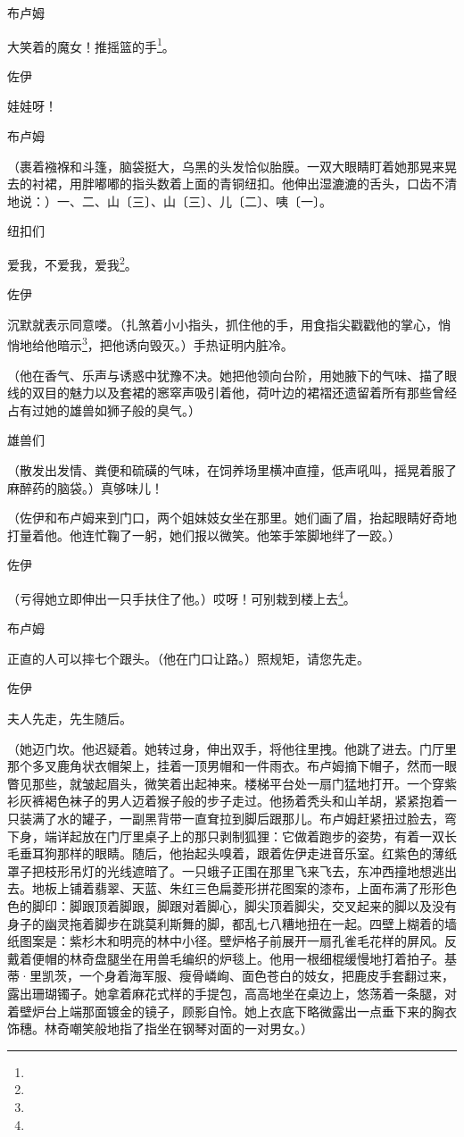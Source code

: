 \par 布卢姆
\par 大笑着的魔女！推摇篮的手\footnote{}。
\par 佐伊
\par 娃娃呀！
\par 布卢姆
\par （裹着襁褓和斗篷，脑袋挺大，乌黑的头发恰似胎膜。一双大眼睛盯着她那晃来晃去的衬裙，用胖嘟嘟的指头数着上面的青铜纽扣。他伸出湿漉漉的舌头，口齿不清地说：）一、二、山〔三〕、山〔三〕、儿〔二〕、咦〔一〕。
\par 纽扣们
\par 爱我，不爱我，爱我\footnote{}。
\par 佐伊
\par 沉默就表示同意喽。（扎煞着小小指头，抓住他的手，用食指尖戳戳他的掌心，悄悄地给他暗示\footnote{}，把他诱向毁灭。）手热证明内脏冷。
\par （他在香气、乐声与诱惑中犹豫不决。她把他领向台阶，用她腋下的气味、描了眼线的双目的魅力以及套裙的窸窣声吸引着他，荷叶边的裙褶还遗留着所有那些曾经占有过她的雄兽如狮子般的臭气。）
\par 雄兽们
\par （散发出发情、粪便和硫磺的气味，在饲养场里横冲直撞，低声吼叫，摇晃着服了麻醉药的脑袋。）真够味儿！
\par （佐伊和布卢姆来到门口，两个姐妹妓女坐在那里。她们画了眉，抬起眼睛好奇地打量着他。他连忙鞠了一躬，她们报以微笑。他笨手笨脚地绊了一跤。）
\par 佐伊
\par （亏得她立即伸出一只手扶住了他。）哎呀！可别栽到楼上去\footnote{}。
\par 布卢姆
\par 正直的人可以摔七个跟头。（他在门口让路。）照规矩，请您先走。
\par 佐伊
\par 夫人先走，先生随后。
\par （她迈门坎。他迟疑着。她转过身，伸出双手，将他往里拽。他跳了进去。门厅里那个多叉鹿角状衣帽架上，挂着一顶男帽和一件雨衣。布卢姆摘下帽子，然而一眼瞥见那些，就皱起眉头，微笑着出起神来。楼梯平台处一扇门猛地打开。一个穿紫衫灰裤褐色袜子的男人迈着猴子般的步子走过。他扬着秃头和山羊胡，紧紧抱着一只装满了水的罐子，一副黑背带一直耷拉到脚后跟那儿。布卢姆赶紧扭过脸去，弯下身，端详起放在门厅里桌子上的那只剥制狐狸：它做着跑步的姿势，有着一双长毛垂耳狗那样的眼睛。随后，他抬起头嗅着，跟着佐伊走进音乐室。红紫色的薄纸罩子把枝形吊灯的光线遮暗了。一只蛾子正围在那里飞来飞去，东冲西撞地想逃出去。地板上铺着翡翠、天蓝、朱红三色扁菱形拼花图案的漆布，上面布满了形形色色的脚印：脚跟顶着脚跟，脚跟对着脚心，脚尖顶着脚尖，交叉起来的脚以及没有身子的幽灵拖着脚步在跳莫利斯舞的脚，都乱七八糟地扭在一起。四壁上糊着的墙纸图案是：紫杉木和明亮的林中小径。壁炉格子前展开一扇孔雀毛花样的屏风。反戴着便帽的林奇盘腿坐在用兽毛编织的炉毯上。他用一根细棍缓慢地打着拍子。基蒂·里凯茨，一个身着海军服、瘦骨嶙峋、面色苍白的妓女，把鹿皮手套翻过来，露出珊瑚镯子。她拿着麻花式样的手提包，高高地坐在桌边上，悠荡着一条腿，对着壁炉台上端那面镀金的镜子，顾影自怜。她上衣底下略微露出一点垂下来的胸衣饰穗。林奇嘲笑般地指了指坐在钢琴对面的一对男女。）
